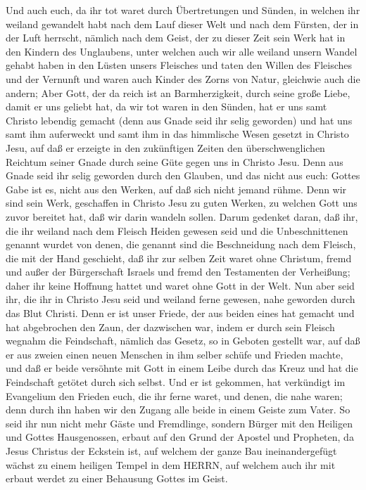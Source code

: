  Und auch euch, da ihr tot waret durch Übertretungen und
Sünden,  in welchen ihr weiland gewandelt habt nach dem Lauf
dieser Welt und nach dem Fürsten, der in der Luft herrscht, nämlich nach
dem Geist, der zu dieser Zeit sein Werk hat in den Kindern des
Unglaubens,  unter welchen auch wir alle weiland unsern
Wandel gehabt haben in den Lüsten unsers Fleisches und taten den Willen
des Fleisches und der Vernunft und waren auch Kinder des Zorns von
Natur, gleichwie auch die andern;  Aber Gott, der da reich
ist an Barmherzigkeit, durch seine große Liebe, damit er uns geliebt
hat,  da wir tot waren in den Sünden, hat er uns samt
Christo lebendig gemacht (denn aus Gnade seid ihr selig geworden)
 und hat uns samt ihm auferweckt und samt ihm in das
himmlische Wesen gesetzt in Christo Jesu,  auf daß er
erzeigte in den zukünftigen Zeiten den überschwenglichen Reichtum seiner
Gnade durch seine Güte gegen uns in Christo Jesu.  Denn aus
Gnade seid ihr selig geworden durch den Glauben, und das nicht aus euch:
Gottes Gabe ist es,  nicht aus den Werken, auf daß sich
nicht jemand rühme.  Denn wir sind sein Werk, geschaffen in
Christo Jesu zu guten Werken, zu welchen Gott uns zuvor bereitet hat,
daß wir darin wandeln sollen.  Darum gedenket daran, daß
ihr, die ihr weiland nach dem Fleisch Heiden gewesen seid und die
Unbeschnittenen genannt wurdet von denen, die genannt sind die
Beschneidung nach dem Fleisch, die mit der Hand geschieht, 
daß ihr zur selben Zeit waret ohne Christum, fremd und außer der
Bürgerschaft Israels und fremd den Testamenten der Verheißung; daher ihr
keine Hoffnung hattet und waret ohne Gott in der Welt.  Nun
aber seid ihr, die ihr in Christo Jesu seid und weiland ferne gewesen,
nahe geworden durch das Blut Christi.  Denn er ist unser
Friede, der aus beiden eines hat gemacht und hat abgebrochen den Zaun,
der dazwischen war, indem er durch sein Fleisch wegnahm die Feindschaft,
 nämlich das Gesetz, so in Geboten gestellt war, auf daß er
aus zweien einen neuen Menschen in ihm selber schüfe und Frieden machte,
 und daß er beide versöhnte mit Gott in einem Leibe durch
das Kreuz und hat die Feindschaft getötet durch sich selbst.
 Und er ist gekommen, hat verkündigt im Evangelium den
Frieden euch, die ihr ferne waret, und denen, die nahe waren;
 denn durch ihn haben wir den Zugang alle beide in einem
Geiste zum Vater.  So seid ihr nun nicht mehr Gäste und
Fremdlinge, sondern Bürger mit den Heiligen und Gottes Hausgenossen,
 erbaut auf den Grund der Apostel und Propheten, da Jesus
Christus der Eckstein ist,  auf welchem der ganze Bau
ineinandergefügt wächst zu einem heiligen Tempel in dem HERRN,
 auf welchem auch ihr mit erbaut werdet zu einer Behausung
Gottes im Geist.

